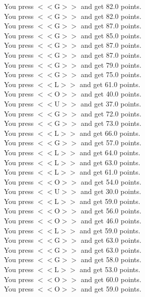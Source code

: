 \documentclass[pdflatex,sn-nature]{sn-jnl}%
\theoremstyle{thmstyleone}%
\theoremstyle{thmstyletwo}%
\theoremstyle{thmstylethree}%
\begin{document}
You press $<<$G$>>$ and get 82.0 points. $~$\\ 
You press $<<$G$>>$ and get 82.0 points. $~$\\ 
You press $<<$G$>>$ and get 87.0 points. $~$\\ 
You press $<<$G$>>$ and get 85.0 points. $~$\\ 
You press $<<$G$>>$ and get 87.0 points. $~$\\ 
You press $<<$G$>>$ and get 87.0 points. $~$\\ 
You press $<<$G$>>$ and get 79.0 points. $~$\\ 
You press $<<$G$>>$ and get 75.0 points. $~$\\ 
You press $<<$L$>>$ and get 61.0 points. $~$\\ 
You press $<<$O$>>$ and get 40.0 points. $~$\\ 
You press $<<$U$>>$ and get 37.0 points. $~$\\ 
You press $<<$G$>>$ and get 72.0 points. $~$\\ 
You press $<<$G$>>$ and get 73.0 points. $~$\\ 
You press $<<$L$>>$ and get 66.0 points. $~$\\ 
You press $<<$G$>>$ and get 57.0 points. $~$\\ 
You press $<<$L$>>$ and get 64.0 points. $~$\\ 
You press $<<$L$>>$ and get 63.0 points. $~$\\ 
You press $<<$L$>>$ and get 61.0 points. $~$\\ 
You press $<<$O$>>$ and get 54.0 points. $~$\\ 
You press $<<$U$>>$ and get 30.0 points. $~$\\ 
You press $<<$L$>>$ and get 59.0 points. $~$\\ 
You press $<<$O$>>$ and get 56.0 points. $~$\\ 
You press $<<$O$>>$ and get 46.0 points. $~$\\ 
You press $<<$L$>>$ and get 59.0 points. $~$\\ 
You press $<<$G$>>$ and get 63.0 points. $~$\\ 
You press $<<$G$>>$ and get 63.0 points. $~$\\ 
You press $<<$G$>>$ and get 58.0 points. $~$\\ 
You press $<<$L$>>$ and get 53.0 points. $~$\\ 
You press $<<$O$>>$ and get 60.0 points. $~$\\ 
You press $<<$O$>>$ and get 59.0 points. $~$\\ 
\end{document}
